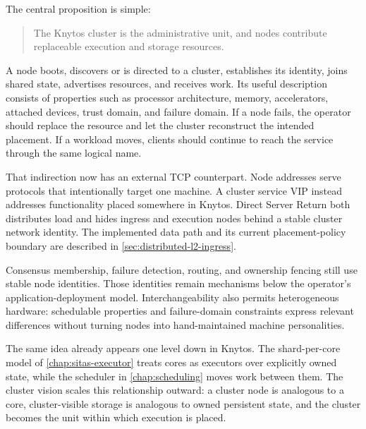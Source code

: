 The central proposition is simple:

\begin{quote}
    The Knytos cluster is the administrative unit, and nodes contribute
    replaceable execution and storage resources.
\end{quote}

A node boots, discovers or is directed to a cluster, establishes its
identity, joins shared state, advertises resources, and receives work. Its
useful description consists of properties such as processor architecture, memory,
accelerators, attached devices, trust domain, and failure domain. If a node
fails, the operator should replace the resource and let the cluster
reconstruct the intended placement. If a workload moves, clients should
continue to reach the service through the same logical name.

That indirection now has an external TCP counterpart. Node addresses serve
protocols that intentionally target one machine. A cluster service VIP instead
addresses functionality placed somewhere in Knytos. Direct Server Return
both distributes load and hides ingress and execution nodes behind a stable
cluster network identity. The
implemented data path and its current placement-policy boundary are described
in \autoref{sec:distributed-l2-ingress}.

Consensus membership, failure detection, routing, and ownership fencing still
use stable node identities. Those identities remain mechanisms below the
operator's application-deployment model. Interchangeability also permits
heterogeneous hardware: schedulable properties and failure-domain constraints
express relevant differences without turning nodes into hand-maintained
machine personalities.

The same idea already appears one level down in Knytos. The
shard-per-core model of \autoref{chap:sitas-executor} treats cores as executors
over explicitly owned state, while the scheduler in
\autoref{chap:scheduling} moves work between them. The
cluster vision scales this relationship outward: a cluster node is analogous
to a core, cluster-visible storage is analogous to owned persistent state,
and the cluster becomes the unit within which execution is placed.

